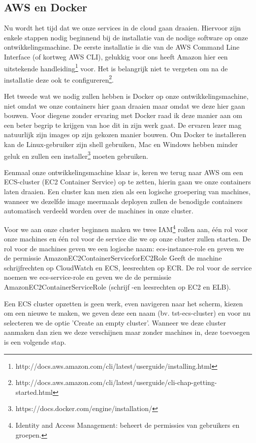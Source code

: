 	\subsection{AWS en Docker}
	Nu wordt het tijd dat we onze services in de cloud gaan draaien. Hiervoor zijn enkele stappen nodig beginnend bij de installatie van de nodige software op onze ontwikkelingsmachine. De eerste installatie is die van de AWS Command Line Interface (of kortweg AWS CLI), gelukkig voor ons heeft Amazon hier een uitstekende handleiding\footnote{http://docs.aws.amazon.com/cli/latest/userguide/installing.html}
	voor. Het is belangrijk niet te vergeten om na de installatie deze ook te configureren\footnote{http://docs.aws.amazon.com/cli/latest/userguide/cli-chap-getting-started.html}.
	\par
	Het tweede wat we nodig zullen hebben is Docker op onze ontwikkelingsmachine, niet omdat we onze containers hier gaan draaien maar omdat we deze hier gaan bouwen. Voor diegene zonder ervaring met Docker raad ik deze manier aan om een beter begrip te krijgen van hoe dit in zijn werk gaat. De ervaren lezer mag natuurlijk zijn images op zijn gekozen manier bouwen. Om Docker te installeren kan de Linux-gebruiker zijn shell gebruiken, Mac en Windows hebben minder geluk en zullen een installer\footnote{https://docs.docker.com/engine/installation/} moeten gebruiken.
	\par
	Eenmaal onze ontwikkelingsmachine klaar is, keren we terug naar AWS om een ECS-cluster (EC2 Container Service) op te zetten, hierin gaan we onze containers laten draaien. Een cluster kan men zien als een logische groepering van machines, wanneer we dezelfde image meermaals deployen zullen de benodigde containers automatisch verdeeld worden over de machines in onze cluster.
	\par
	Voor we aan onze cluster beginnen maken we twee IAM\footnote{Identity and Access Management: beheert de permissies van gebruikers en groepen.} rollen aan, \'e\'en rol voor onze machines en \'e\'en rol voor de service die we op onze cluster zullen starten. De rol voor de machines geven we een logische naam: ecs-instance-role en geven we de permissie AmazonEC2ContainerServiceforEC2Role {Geeft de machine schrijfrechten op CloudWatch en ECS, leesrechten op ECR}. De rol voor de service noemen we ecs-service-role en geven we de de permissie AmazonEC2ContainerServiceRole (schrijf -en leesrechten op EC2 en ELB). 
	\par	
	 Een ECS cluster opzetten is geen werk, even navigeren naar het scherm, kiezen om een nieuwe te maken, we geven deze een naam (bv. tst-ecs-cluster) en voor nu selecteren we de optie 'Create an empty cluster'. Wanneer we deze cluster aanmaken dan zien we deze verschijnen maar zonder machines in, deze toevoegen is een volgende stap.
